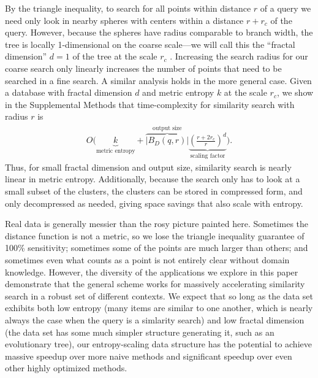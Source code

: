 \documentclass[review,preprint,12pt]{elsarticle}
\renewcommand{\cite}{\citep} %
\theoremstyle{definition}
\theoremstyle{remark}
\numberwithin{equation}{section}
\begin{document}
By the triangle inequality, to search for all points within distance $r$ of a query we need only look in nearby spheres with centers within a distance $r+r_c$ of the query.
However, because the spheres have radius comparable to branch width, the tree is locally 1-dimensional on the coarse scale---we will call this the ``fractal dimension'' $d=1$ of the tree at the scale $r_c$ \cite{falconer1990fractal}.
Increasing the search radius for our coarse search only linearly increases the number of points that need to be searched in a fine search.
A similar analysis holds in the more general case.
Given a database with fractal dimension $d$ and metric entropy $k$ at the scale $r_c$, we show in the Supplemental Methods that time-complexity for similarity search with radius $r$ is
\begin{gather}
    O\Bigg(
    \underbrace{k}_{\textrm{metric entropy}} +
    \overbrace{\left|B_D(q,r)\right|}^{\textrm{output size}}
    \underbrace{\left(\frac{r+2r_c}{r}\right)^d}_{\textrm{scaling factor}}
     \Bigg) .
\end{gather}
Thus, for small fractal dimension and output size, similarity search is nearly linear in metric entropy.
Additionally, because the search only has to look at a small subset of the clusters, the clusters can be stored in compressed form, and only decompressed as needed, giving space savings that also scale with entropy.

Real data is generally messier than the rosy picture painted here.
Sometimes the distance function is not a metric, so we lose the triangle inequality guarantee of 100\% sensitivity;
sometimes some of the points are much larger than others;
and sometimes even what counts as a point is not entirely clear without domain knowledge.
%
However, the diversity of the applications we explore in this paper demonstrate that the general scheme works for massively accelerating similarity search in a robust set of different contexts.
We expect that so long as the data set exhibits both low entropy (many items are similar to one another, which is nearly always the case when the query is a simlarity search) and low fractal dimension (the data set has some much simpler structure generating it, such as an evolutionary tree), our entropy-scaling data structure has the potential to achieve massive speedup over more naive methods and significant speedup over even other highly optimized methods.
\end{document}
